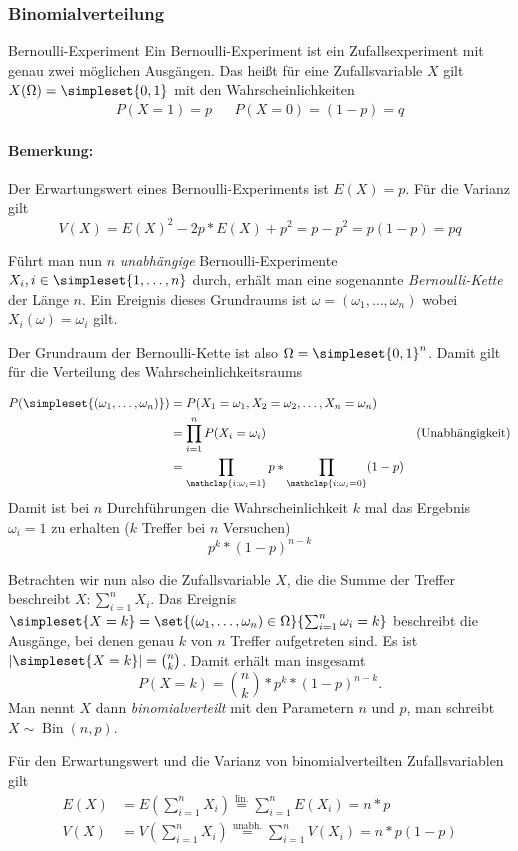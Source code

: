 \subsubsection{Binomialverteilung}
\begin{definition}{Bernoulli-Experiment}
	Ein Bernoulli-Experiment ist ein Zufallsexperiment mit genau zwei möglichen Ausgängen. Das heißt für eine Zufallsvariable $X$ gilt $X(\Omega)=\simpleset{0,1}$ mit den Wahrscheinlichkeiten
	\begin{align*}
		P(X=1)=p && P(X=0)=(1-p)=q
	\end{align*}
\end{definition}
\paragraph{Bemerkung:}
Der Erwartungswert eines Bernoulli-Experiments ist $E(X)=p$. Für die Varianz gilt 
\begin{equation*}
	V(X)=E(X)^2-2p*E(X)+p^2=p-p^2=p(1-p)=pq
\end{equation*}

Führt man nun $n$ \emph{unabhängige} Bernoulli-Experimente $X_i, i\in\simpleset{1,\ldots,n}$ durch, erhält man eine sogenannte \emph{Bernoulli-Kette} der Länge $n$. Ein Ereignis dieses Grundraums ist $\omega=(\omega_1,\ldots,\omega_n)$ wobei $X_i(\omega)=\omega_i$ gilt.

Der Grundraum der Bernoulli-Kette ist also $\Omega=\simpleset{0,1}^n$. Damit gilt für die Verteilung des Wahrscheinlichkeitsraums

\begin{align*}
	P(\simpleset{(\omega_1,\ldots,\omega_n)})&=P(X_1=\omega_1, X_2=\omega_2, \ldots, X_n=\omega_n)\\
	&=\prod_{i=1}^n P(X_i=\omega_i) &\text{(Unabhängigkeit)}\\
	&=\prod_{\mathclap{i:\omega_i=1}}p * \prod_{\mathclap{i:\omega_i=0}}(1-p)
\end{align*}
Damit ist bei $n$ Durchführungen die Wahrscheinlichkeit $k$ mal das Ergebnis $\omega_i=1$ zu erhalten ($k$ Treffer bei $n$ Versuchen) 
\begin{equation*}
	p^k*(1-p)^{n-k}
\end{equation*}

Betrachten wir nun also die Zufallsvariable $X$, die die Summe der Treffer beschreibt $X:\sum_{i=1}^n X_i$.
Das Ereignis $\simpleset{X=k}=\set{(\omega_1,\ldots,\omega_n)\in\Omega}{\sum_{i=1}^n \omega_i=k}$ beschreibt die Ausgänge, bei denen genau $k$ von $n$ Treffer aufgetreten sind. Es ist $|\simpleset{X=k}|=\binom nk$. Damit erhält man insgesamt
\begin{equation*}
	P(X=k)=\binom nk * p^k*(1-p)^{n-k}.
\end{equation*}
Man nennt $X$ dann \emph{binomialverteilt} mit den Parametern $n$ und $p$, man schreibt $X\sim \operatorname{Bin}(n,p)$.

Für den Erwartungswert und die Varianz von binomialverteilten Zufallsvariablen gilt
\begin{align*}
	E(X)&=E\left(\sum_{i=1}^n X_i\right)\overset{\text{lin.}}=\sum_{i=1}^n E(X_i)=n*p\\
	V(X)&=V\left(\sum_{i=1}^n X_i\right)\overset{\text{unabh.}}=\sum_{i=1}^n V(X_i)=n*p(1-p)
\end{align*}